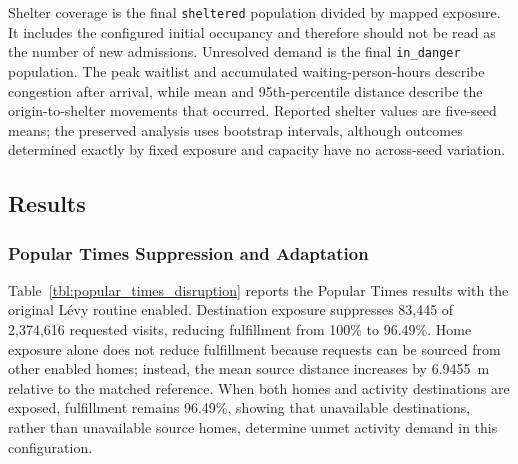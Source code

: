 Shelter coverage is the final \texttt{sheltered} population divided by mapped exposure. It includes the configured initial occupancy and therefore should not be read as the number of new admissions. Unresolved demand is the final \texttt{in\_danger} population. The peak waitlist and accumulated waiting-person-hours describe congestion after arrival, while mean and 95th-percentile distance describe the origin-to-shelter movements that occurred. Reported shelter values are five-seed means; the preserved analysis uses bootstrap intervals, although outcomes determined exactly by fixed exposure and capacity have no across-seed variation.

\subsection{Results}
\label{sec:environment_disruption_results}

\subsubsection{Popular Times Suppression and Adaptation}

Table~\ref{tbl:popular_times_disruption} reports the Popular Times results with the original L\'evy routine enabled. Destination exposure suppresses 83,445 of 2,374,616 requested visits, reducing fulfillment from 100\% to 96.49\%. Home exposure alone does not reduce fulfillment because requests can be sourced from other enabled homes; instead, the mean source distance increases by 6.9455~m relative to the matched reference. When both homes and activity destinations are exposed, fulfillment remains 96.49\%, showing that unavailable destinations, rather than unavailable source homes, determine unmet activity demand in this configuration.

